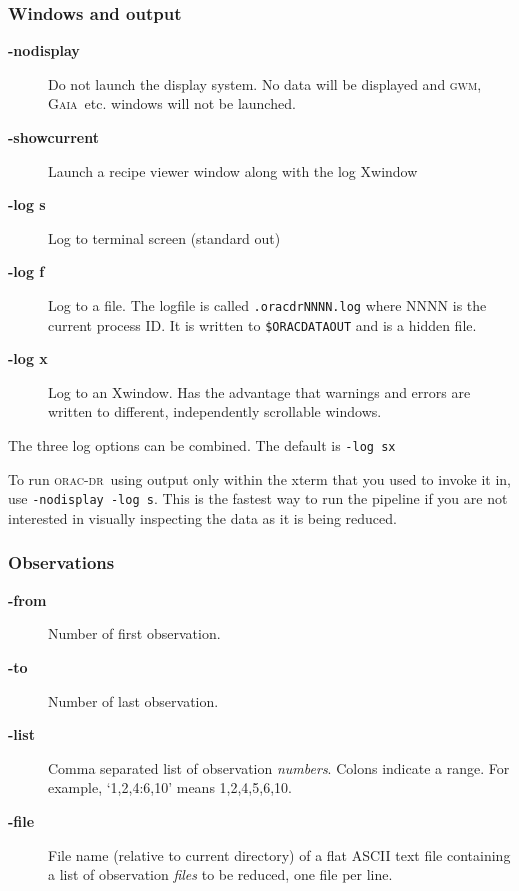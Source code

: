 \documentclass[twoside,11pt]{article}
\newcommand{\xref}[3]{#1}
\renewcommand{\_}{\texttt{\symbol{95}}}
\newcommand{\oracdr}{\textsc{orac-dr}}
\newcommand{\gaia}{\xref{{\textsc{Gaia}}}{sun214}{}}
\newcommand{\gwm}{\xref{\textsc{gwm}}{sun219}{}}
\begin{document}
\subsubsection*{Windows and output\label{oracdr_Windows_and_output}}
\begin{description}
\item[\textbf{-nodisplay}] \mbox{}

Do not launch the display system. No data will be displayed and \gwm,
\gaia\ etc. windows will not be launched.

\item[\textbf{-showcurrent}] \mbox{}

Launch a recipe viewer window along with the log Xwindow

\item[\textbf{-log s}] \mbox{}

Log to terminal screen (standard out)

\item[\textbf{-log f}] \mbox{}

Log to a file. The logfile is called \texttt{.oracdr\_NNNN.log} where NNNN 
is the current process ID. It is written to \texttt{\$ORAC\_DATA\_OUT} and is 
a hidden file.

\item[\textbf{-log x}] \mbox{}

Log to an Xwindow. Has the advantage that warnings and errors are
written to different, independently scrollable windows.

\end{description}


The three log options can be combined. The default is \texttt{-log sx}



To run \oracdr\ using output only within the xterm that you used
to invoke it in, use \texttt{-nodisplay -log s}. This is the fastest way
to run the pipeline if you are not interested in visually
inspecting the data as it is being reduced.

\subsubsection*{Observations\label{oracdr_Observations}}
\begin{description}
\item[\textbf{-from}] \mbox{}

Number of first observation.

\item[\textbf{-to}] \mbox{}

Number of last observation.

\item[\textbf{-list}] \mbox{}

Comma separated list of observation \textit{numbers}. Colons indicate a range.
For example, `1,2,4:6,10' means 1,2,4,5,6,10.

\item[\textbf{-file}] \mbox{}

File name (relative to current directory) of a flat ASCII text file containing
a list of observation \textit{files} to be reduced, one file per line.

\end{description}
\end{document}
